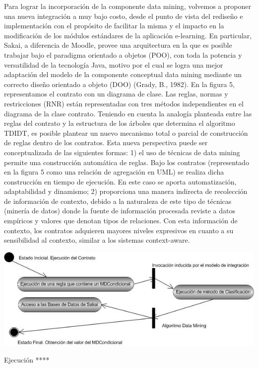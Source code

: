 Para lograr la incorporación de la componente data mining, volvemos a proponer
una nueva integración a muy bajo costo, desde el punto de vista del
rediseño e implementación con el propósito de facilitar la misma y el impacto
en la modificación de los módulos estándares de la aplicación e-learning. En
particular, Sakai, a diferencia de Moodle, provee una arquitectura en la que es
posible trabajar bajo el paradigma orientado a objetos (POO), con toda la
potencia y versatilidad de la tecnología Java, motivo por el cual se logra una
mejor adaptación del modelo de la componente conceptual data mining
mediante un correcto diseño orientado a objeto (DOO) (Grady, B., 1982).
En la figura 5, representamos el contrato con un diagrama de clase. Las
reglas, normas y restricciones (RNR) están representadas con tres métodos
independientes en el diagrama de la clase contrato.
Teniendo en cuenta la analogía planteada entre las reglas del contrato y la
estructura de los árboles que determina el algoritmo TDIDT, es posible plantear
un nuevo mecanismo total o parcial de construcción de reglas dentro de los
contratos. Esta nueva perspectiva puede ser conceptualizada de las siguientes
formas: 1) el uso de técnicas de data mining permite una construcción automática
de reglas. Bajo los contratos (representado en la figura 5 como una
relación de agregación en UML) se realiza dicha construcción en tiempo de
ejecución. En este caso se aporta automatización, adaptabilidad y dinamismo;
2) proporciona una manera indirecta de recolección de información de contexto,
debido a la naturaleza de este tipo de técnicas (minería de datos) donde
la fuente de información procesada reviste a datos empíricos y valores que
denotan tipos de relaciones. Con esta información de contexto, los contratos
adquieren mayores niveles expresivos en cuanto a su sensibilidad al contexto,
similar a los sistemas context-aware.


\begin{center}
\includegraphics[width=6 in,totalheight=2 in]{Ch4/f4.jpg}
\caption {Ejecución ****}
\label{fig:ejecucion}
\end{center}



